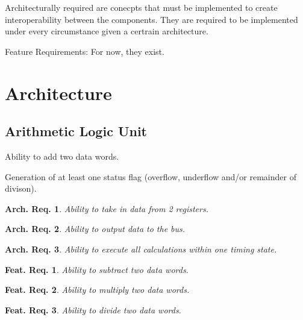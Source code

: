 \newtheorem{arch-requirement}{Arch. Req.}[subsection]
Architecturally required are conecpts that must be implemented to create interoperability between the components. They are required to be implemented under every circumstance given a certrain architecture. 

\newtheorem{feat-requirement}{Feat. Req.}[subsection]
Feature Requirements: For now, they exist.


\section{Architecture}

\subsection{Arithmetic Logic Unit}

\begin{turing-requirement}
  Ability to add two data words.
\end{turing-requirement}

\begin{turing-requirement}
  Generation of at least one status flag (overflow, underflow and/or remainder of divison). 
\end{turing-requirement}

\begin{arch-requirement}
  Ability to take in data from 2 registers.
\end{arch-requirement}

\begin{arch-requirement}
  Ability to output data to the bus. 
\end{arch-requirement}

\begin{arch-requirement}
  Ability to execute all calculations within one timing state.
\end{arch-requirement}

\begin{feat-requirement}
  Ability to subtract two data words.
\end{feat-requirement}

\begin{feat-requirement}
  Ability to multiply two data words.
\end{feat-requirement}

\begin{feat-requirement}
  Ability to divide two data words.
\end{feat-requirement}

